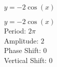 {$y = -2\cos(x)$}
{$y = -2\cos(x)$\\
Period: $2\pi$\\
Amplitude: $2$\\
Phase Shift: $0$\\
Vertical Shift: $0$

\begin{center}
\end{center}
}
